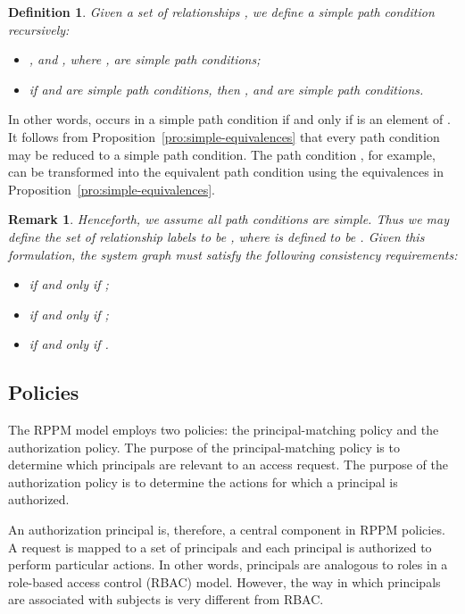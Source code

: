 \documentclass{article}
\newtheorem{definition}{Definition}
\newtheorem{remark}{Remark}
\begin{document}
\begin{definition}\label{def:simple-path-condition}Given a set of relationships , we define a \emph{simple path condition} recursively:
    \begin{itemize}
        \item ,  and , where , are simple path conditions;
        \item if  and  are simple path conditions, then ,  and  are simple path conditions.
    \end{itemize}
\end{definition}

In other words,  occurs in a simple path condition if and only if  is an element of .
It follows from Proposition~\ref{pro:simple-equivalences} that every path condition may be reduced to a simple path condition.
The path condition , for example, can be transformed into the equivalent path condition  using the equivalences in Proposition~\ref{pro:simple-equivalences}.

\begin{remark}\label{rem:r-includes-rbar}
    Henceforth, we assume all path conditions are simple.
    Thus we may define the set of relationship labels to be , where  is defined to be .
    Given this formulation, the system graph must satisfy the following consistency requirements:
    \begin{itemize}
     \item  if and only if ;
     \item  if and only if ;
     \item  if and only if .
    \end{itemize}
\end{remark}

\subsection{Policies}\label{sec:model:policies}

\newcommand{\all}{\mathsf{all}}
\newcommand{\none}{\mathsf{none}}

The RPPM model employs two policies: the principal-matching policy and the authorization policy.
The purpose of the principal-matching policy is to determine which principals are relevant to an access request.
The purpose of the authorization policy is to determine the actions for which a principal is authorized.

An authorization principal is, therefore, a central component in RPPM policies.
A request is mapped to a set of principals and each principal is authorized to perform particular actions.
In other words, principals are analogous to roles in a role-based access control (RBAC) model.
However, the way in which principals are associated with subjects is very different from RBAC.
\end{document}
